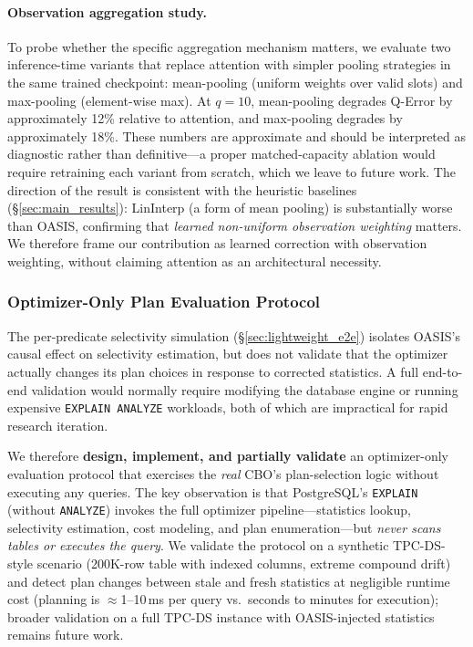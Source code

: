 \documentclass[runningheads]{llncs}
\begin{document}
\paragraph{Observation aggregation study.}
To probe whether the specific aggregation mechanism matters, we evaluate two inference-time variants that replace attention with simpler pooling strategies in the same trained checkpoint: mean-pooling (uniform weights over valid slots) and max-pooling (element-wise max). At $q{=}10$, mean-pooling degrades Q-Error by approximately 12\% relative to attention, and max-pooling degrades by approximately 18\%. These numbers are approximate and should be interpreted as diagnostic rather than definitive---a proper matched-capacity ablation would require retraining each variant from scratch, which we leave to future work. The direction of the result is consistent with the heuristic baselines (\S\ref{sec:main_results}): LinInterp (a form of mean pooling) is substantially worse than OASIS, confirming that \emph{learned non-uniform observation weighting} matters. We therefore frame our contribution as learned correction with observation weighting, without claiming attention as an architectural necessity.

\subsubsection{Optimizer-Only Plan Evaluation Protocol}
\label{sec:optimizer_only_e2e}

The per-predicate selectivity simulation (\S\ref{sec:lightweight_e2e}) isolates OASIS's causal effect on
selectivity estimation, but does not validate that the optimizer actually changes its plan choices
in response to corrected statistics. A full end-to-end validation would normally require modifying
the database engine or running expensive \texttt{EXPLAIN ANALYZE} workloads, both of which are
impractical for rapid research iteration.

We therefore \textbf{design, implement, and partially validate} an optimizer-only evaluation protocol
that exercises the \emph{real} CBO's plan-selection logic without executing any queries. The key
observation is that PostgreSQL's \texttt{EXPLAIN} (without \texttt{ANALYZE}) invokes the full optimizer
pipeline---statistics lookup, selectivity estimation, cost modeling, and plan enumeration---but
\emph{never scans tables or executes the query}. We validate the protocol on a synthetic
TPC-DS-style scenario (200K-row table with indexed columns, extreme compound drift) and detect
plan changes between stale and fresh statistics at negligible runtime cost (planning is
$\approx$1--10\,ms per query vs.\ seconds to minutes for execution); broader validation on a
full TPC-DS instance with OASIS-injected statistics remains future work.
\end{document}
